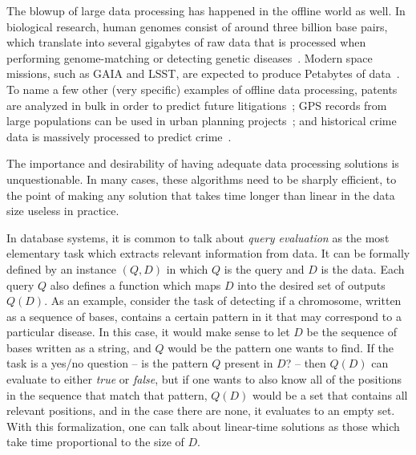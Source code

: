 The blowup of large data processing has happened in the offline world as well. In biological research, human genomes consist of around three billion base pairs, which translate into several gigabytes of raw data that is processed when performing genome-matching or detecting genetic diseases~\cite{genomes}. Modern space missions, such as GAIA and LSST, are expected to produce Petabytes of data~\cite{space}. To name a few other (very specific) examples of offline data processing, patents are analyzed in bulk in order to predict future litigations~\cite{patents}; GPS records from large populations can be used in urban planning projects~\cite{urban}; and historical crime data is massively processed to predict crime~\cite{crime}.

The importance and desirability of having adequate data processing solutions is unquestionable. In many cases, these algorithms need to be sharply efficient, to the point of making any solution that takes time longer than linear in the data size useless in practice.

In database systems, it is common to talk about {\it query evaluation} as the most elementary task which extracts relevant information from data. It can be formally defined by an instance $(Q, D)$ in which $Q$ is the query and $D$ is the data. Each query $Q$ also defines a function which maps $D$ into the desired set of outputs $Q(D)$.
As an example, consider the task of detecting if a chromosome, written as a sequence of bases, contains a certain pattern in it that may correspond to a particular disease. In this case, it would make sense to let $D$ be the sequence of bases written as a string, and $Q$ would be the pattern one wants to find. If the task is a yes/no question -- is the pattern $Q$ present in $D$? -- then $Q(D)$ can evaluate to either {\it true} or {\it false}, but if one wants to also know all of the positions in the sequence that match that pattern, $Q(D)$ would be a set that contains all relevant positions, and in the case there are none, it evaluates to an empty set.
With this formalization, one can talk about linear-time solutions as those which take time proportional to the size of $D$.

